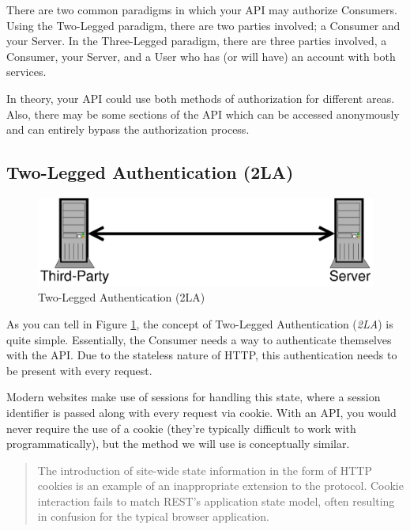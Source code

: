 \documentclass{book}
\begin{document}
There are two common paradigms in which your API may authorize Consumers. Using the Two-Legged paradigm, there are two parties involved; a Consumer and your Server. In the Three-Legged paradigm, there are three parties involved, a Consumer, your Server, and a User who has (or will have) an account with both services.

In theory, your API could use both methods of authorization for different areas. Also, there may be some sections of the API which can be accessed anonymously and can entirely bypass the authorization process.

\subsection{Two-Legged Authentication (2LA)}

\begin{figure}[!htb]
\centering
\includegraphics[scale=.6]{images/two-legged.eps}
\caption{Two-Legged Authentication (2LA)}
\label{fig:twolegged}
\end{figure}

As you can tell in Figure \ref{fig:twolegged}, the concept of Two-Legged Authentication (\emph{2LA}) is quite simple. Essentially, the Consumer needs a way to authenticate themselves with the API. Due to the stateless nature of HTTP, this authentication needs to be present with every request.

Modern websites make use of sessions for handling this state, where a session identifier is passed along with every request via cookie. With an API, you would never require the use of a cookie (they're typically difficult to work with programmatically), but the method we will use is conceptually similar.

\begin{quote}
The introduction of site-wide state information in the form of HTTP cookies is an example of an inappropriate extension to the protocol. Cookie interaction fails to match REST’s application state model, often resulting in confusion for the typical browser application.\cite[Page 145]{ACMV2N2}
\end{quote}
\end{document}
